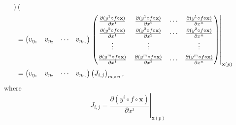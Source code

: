 \documentclass{report}
\begin{document}
{\[\begin{aligned}
\begin{pmatrix}
            \end{pmatrix}\\
            &=
            \begin{pmatrix}
            v_{\eta_1}&v_{\eta_2}&\cdots&v_{\eta_m}
            \end{pmatrix}
            \renewcommand{\arraystretch}{1.5}
            \left.\begin{pmatrix}
                \frac{\partial(y^1 \circ f\circ\mathbf{x})}{\partial x^1}&\frac{\partial(y^1 \circ f\circ\mathbf{x})}{\partial x^2}&\cdots&\frac{\partial(y^1 \circ f\circ\mathbf{x})}{\partial x^n}\\
                \frac{\partial(y^2 \circ f\circ\mathbf{x})}{\partial x^1}&\frac{\partial(y^2 \circ f\circ\mathbf{x})}{\partial x^2}&\cdots&\frac{\partial(y^2 \circ f\circ\mathbf{x})}{\partial x^n}\\
                \vdots&\vdots&&\vdots\\
                \frac{\partial(y^m \circ f\circ\mathbf{x})}{\partial x^1}&\frac{\partial(y^m \circ f\circ\mathbf{x})}{\partial x^2}&\cdots&\frac{\partial(y^m \circ f\circ\mathbf{x})}{\partial x^n}
            \end{pmatrix}\right|_{\mathbf{x}(p)}
            \renewcommand{\arraystretch}{1}\\
            &=
            \begin{pmatrix}
            v_{\eta_1}&v_{\eta_2}&\cdots&v_{\eta_m}
            \end{pmatrix}
            \begin{pmatrix}
           J_{i,j}
           \end{pmatrix}_{m\times n},
        \end{aligned}
    \]
    where
    \[
        J_{i,j}=\left.\frac{\partial(y^i \circ f\circ\mathbf{x})}{\partial x^j}\right|_{\mathbf{x}(p)}
        \]
}
\end{document}
